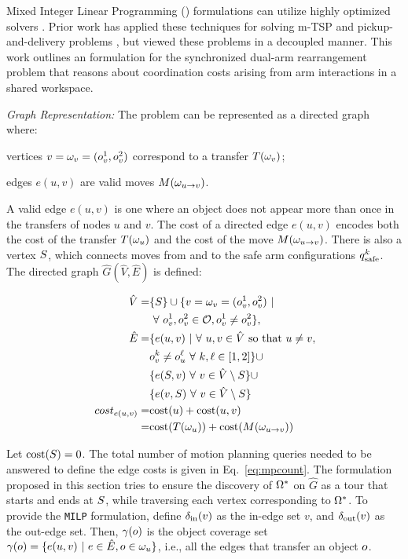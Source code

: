 Mixed Integer Linear Programming (\milp) formulations can utilize highly optimized solvers \cite{gurobi}. Prior work has applied these techniques for solving m-TSP \cite{rathinam2006matroid,friggstad2013multiple} and pickup-and-delivery problems \cite{coltin2014multi,savelsbergh1995general}, but viewed these problems in a decoupled manner. This work outlines an \milp formulation for the synchronized dual-arm rearrangement problem that reasons about coordination costs arising from arm interactions in a shared workspace.

\textit{Graph Representation:}
The problem can be represented as a directed graph where:
\begin{myitem}
\item vertices $v = {\omega}_v = (o_v^1, o_v^2)$ correspond to a transfer $ T({\omega}_v) $;
\item edges $e(u,v)$ are valid moves $M({\omega}_{u\rightarrow v})$.
\end{myitem} 
A valid edge $e(u,v)$ is one where an object does not appear more than once in the transfers of nodes $u$ and $v$.  The cost of a directed edge $e(u,v)$ encodes both the cost of the transfer  $ T({\omega}_u) $ and the cost of the move $M({\omega}_{u\rightarrow v})$. There is also a vertex $ S $, which connects moves from and to the safe arm configurations $q^k_{\rm safe}$.  The directed graph $ \hat{G} (\hat{V},\hat{E}) $ is defined:

\vspace{-.1in}
\begin{align*}
\hspace{0.5in} \hat{V} =& \{S\} \cup \{ v = {\omega}_v = (o_v^1,o_v^2)\ |\\& \  \forall\ o_v^1,o_v^2 \in \mathcal{O}, o_v^1 \neq o_v^2 \}, \\
\hat{E} =& \{  e(u,v)\ | \ \forall\ u,v\in \hat{V} \textrm{ so that } u\neq v,\ \\& 
o_v^k \neq o_u^{\ell}\ \forall\ k, \ell \in [1,2] \}
\cup\ \\&
 \{e(S,v)\ \forall\ v\in\hat{V}\setminus S\} \cup \\& \{e(v,S)\ \forall\ v\in\hat{V}\setminus S\}\\
cost_{e(u,v)} = & \textup{cost}(u) + \textup{cost}(u,v)\\ = &\textup{cost}(T({\omega}_u)) + \textup{cost}(M({\omega}_{u\rightarrow v}))
\end{align*}

Let $\textup{cost}(S) = 0$. The total number of motion planning queries needed to be answered to define the edge costs is given in Eq.~\ref{eq:mpcount}. The formulation proposed in this section tries to ensure the discovery of $ {{\Omega}}^* $ on $ \hat{G} $ as a tour that starts and ends at $ S $, while traversing each vertex corresponding to $ {{\Omega}}^* $. To provide the {\tt MILP} formulation, define $ \delta_{\rm in}(v) $ as the in-edge set $v$, and  $ \delta_{\rm out}(v) $ as the out-edge set. Then, $ \gamma(o) $ is the object coverage set $ \gamma(o) = \{ e(u,v) \ |\ e\in\hat{E}, o\in  {\omega}_u  \} $, i.e., all the edges that transfer an object $ o $.

